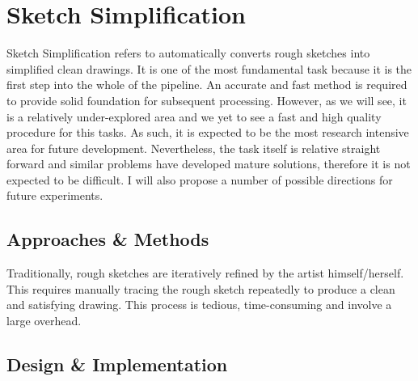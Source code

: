 \chapter{Sketch Simplification}

Sketch Simplification refers to automatically converts rough sketches into simplified clean drawings. It is one of the most fundamental task because it is the first step into the whole of the pipeline. An accurate and fast method is required to provide solid foundation for subsequent processing. However, as we will see, it is a relatively under-explored area and we yet to see a fast and high quality procedure for this tasks. As such, it is expected to be the most research intensive area for future development. Nevertheless, the task itself is relative straight forward and similar problems have developed mature solutions, therefore it is not expected to be difficult. I will also propose a number of possible directions for future experiments.

\label{chapterlabel4}
\section{Approaches \& Methods}
Traditionally, rough sketches are iteratively refined by the artist himself/herself. This requires manually tracing the rough sketch repeatedly to produce a clean and satisfying drawing. This process is tedious, time-consuming and involve a large overhead.


\section{Design \& Implementation}



